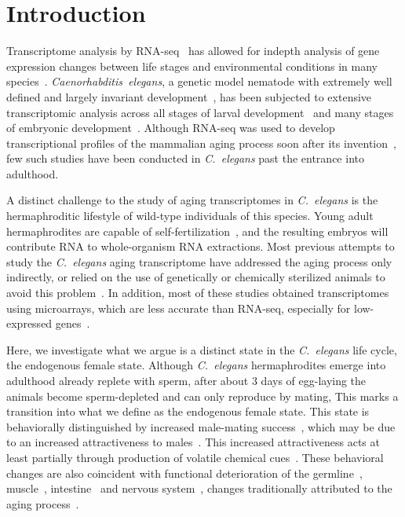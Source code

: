 \documentclass[10pt,letterpaper,twocolumn]{article}
\newcommand{\cel}{\emph{C.~elegans}}
\begin{document}
\section*{Introduction}
\label{sec:introduction}
Transcriptome analysis by RNA-seq~\cite{Mortazavi2008} has allowed for indepth
analysis of gene expression changes between life stages and environmental
conditions in many species~\cite{Gerstein2014,Blaxter2012}.
\emph{Caenorhabditis~elegans}, a genetic model nematode with extremely
well defined and largely invariant development~\cite{Sulston1977,Sulston1983},
has been subjected to extensive transcriptomic analysis across all stages of
larval development~\cite{Hillier2009,Boeck2016,Murray2012}
and many stages of embryonic development~\cite{Boeck2016}. Although RNA-seq was
used to develop transcriptional profiles of the mammalian aging process soon
after its invention~\cite{Magalhaes2010}, few such studies have been conducted
in \cel{} past the entrance into adulthood.

A distinct challenge to the study of aging transcriptomes in \cel{} is the
hermaphroditic lifestyle of wild-type individuals of this species. Young adult
hermaphrodites are capable of self-fertilization~\cite{Brenner1974,Corsi2015},
and the resulting embryos will contribute RNA to whole-organism RNA extractions.
Most previous attempts to study the \cel{} aging transcriptome have addressed
the aging process only indirectly, or relied on the use of genetically or
chemically sterilized animals to avoid this problem~\cite{Murphy2003,
Halaschek-wiener2005,Lund2002,McCormick2012,Eckley2013,Boeck2016,Rangaraju2015}.
In addition, most of these studies obtained transcriptomes using microarrays,
which are less accurate than RNA-seq, especially for low-expressed
genes~\cite{Wang2014}.

Here, we investigate what we argue is a distinct state in the \cel{} life cycle,
the endogenous female state. Although \cel{} hermaphrodites emerge into adulthood
already replete with sperm, after about 3 days of egg-laying the animals become
sperm-depleted and can only reproduce by mating, This marks a transition into
what we define as the endogenous female state. This state is behaviorally
distinguished by increased male-mating success~\cite{Garcia2007}, which may be
due to an increased attractiveness to males~\cite{Morsci2011}. This increased
attractiveness acts at least partially through production of volatile chemical
cues~\cite{Leighton2014}.
These behavioral changes are also coincident with functional deterioration of
the germline~\cite{Andux2008}, muscle~\cite{Herndon2002},
intestine~\cite{McGee2011} and nervous system~\cite{Liu2013}, changes
traditionally attributed to the aging process~\cite{Golden2007}.
\end{document}
